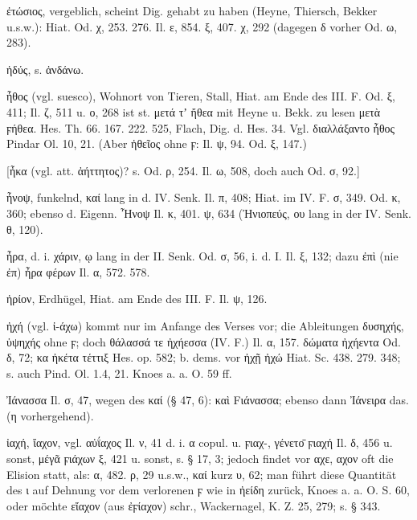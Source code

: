 ἐτώσιος, vergeblich, scheint Dig. gehabt zu haben (Heyne, Thiersch, Bekker u.s.w.): Hiat. Od. χ, 253. 276. Il. ε, 854. ξ, 407. χ, 292 (dagegen δ vorher Od. ω, 283).

ἡδύς, s. ἁνδάνω.

ἧθος (vgl.  suesco), Wohnort von Tieren, Stall, Hiat. am Ende des III. F. Od. ξ, 411; Il. ζ, 511 u. ο, 268 ist st. μετά τʼ ἤθεα mit Heyne u. Bekk. zu lesen μετὰ ϝήθεα. Hes. Th. 66. 167. 222. 525, Flach, Dig. d. Hes. 34. Vgl. διαλλάξαντο ἦθος Pindar Ol. 10, 21. (Aber ἠθεῖος ohne ϝ: Il. ψ, 94. Od. ξ, 147.)

[ἦκα (vgl. att. ἀήττητος)? s. Od. ρ, 254. Il. ω, 508, doch auch Od. σ, 92.]

ἦνοψ, funkelnd, καί lang in d. IV. Senk. Il. π, 408; Hiat. im IV. F. σ, 349. Od. κ, 360; ebenso d. Eigenn. Ἦνοψ Il. κ, 401. ψ, 634 (Ἠνιοπεύς, ου lang in der IV. Senk. θ, 120).

ἦρα, d. i. χάριν, ῳ lang in der II. Senk. Od. σ, 56, i. d. I. Il. ξ, 132; dazu ἐπὶ (nie ἐπ) ἦρα φέρων Il. α, 572. 578.

ἠρίον, Erdhügel, Hiat. am Ende des III. F. Il. ψ, 126.

ἠχή (vgl. ἰ-άχω) kommt nur im Anfange des Verses vor; die Ableitungen δυσηχής, ὑψηχής ohne ϝ; doch θάλασσά τε ἠχήεσσα (IV. F.) Il. α, 157. δώματα ἠχήεντα Od. δ, 72; κα ἠκέτα τέττιξ Hes. op. 582; b. dems. vor ἠχῇ ἠχώ Hiat. Sc. 438. 279. 348; s. auch Pind. Ol. 1.4, 21. Knoes a. a. O. 59 ff.

Ἰάνασσα Il. σ, 47, wegen des καί (§ 47, 6): καὶ Fιάνασσα; ebenso dann Ἰάνειρα das. (η vorhergehend).

ἰαχή, ἴαχον, vgl. αὐΐαχος Il. ν, 41 d. i. α copul. u. ϝιαχ-, γένετο̄ ϝιαχή Il. δ, 456 u. sonst, μέγᾶ ϝιάχων ξ, 421 u. sonst, s. § 17, 3; jedoch findet vor αχε, αχον oft die Elision statt, als: α, 482. ρ, 29 u.s.w., καί kurz υ, 62; man führt diese Quantität des ι auf Dehnung vor dem verlorenen ϝ wie in ἠείδη zurück, Knoes a. a. O. S. 60, oder möchte εἴαχον (aus ἐϝίαχον) schr., Wackernagel, K. Z. 25, 279; s. § 343.

